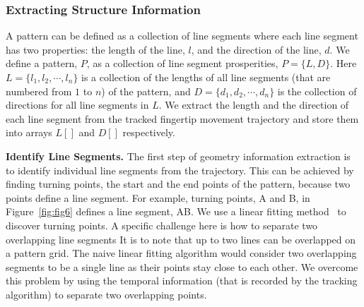     \subsubsection{Extracting Structure Information}
        A pattern can be defined as a collection of line
        segments where each line segment has two properties:
        the length of the line, $l$, and the direction of the line, $d$.
        We define a
         pattern, $P$, as a collection of line segment prosperities,  $P=\{L, D\}$.
        Here $L=\{l_{1}, l_{2}, \cdots, l_{n}\}$ is a collection of the lengths
        of all line segments (that are numbered from $1$ to $n$) of the pattern, and $D=\{d_{1}, d_{2}, \cdots, d_{n}\}$ is the collection of directions for all line segments in $L$.
        We extract the length and the direction of each line segment from the tracked fingertip movement trajectory and store them
        into arrays $L[]$ and $D[]$ respectively.

        \noindent \textbf{Identify Line Segments.}
        The first step of geometry information extraction is to identify individual
        line segments from the trajectory. This can be achieved
        by finding turning points, the start and the end points of the pattern, because two points define a line segment. For example, turning points, A and B, in
        Figure~\ref{fig:fig6} defines a line segment, AB.
        We use a linear fitting
        method~\cite{Kutner2004Applied} to discover turning points. %
        A specific challenge here is how to separate two overlapping line segments 
        It is to note that up to two lines can be overlapped on a pattern grid.
        The naive
        linear fitting algorithm would consider two overlapping segments to be a
        single line as their points stay close to each other. We overcome this problem
       by using the temporal information (that is recorded by the
        tracking algorithm) to separate two overlapping points.

